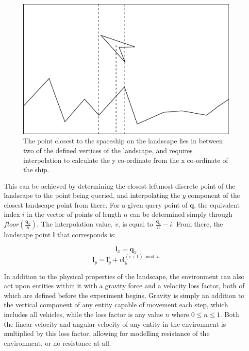\documentclass[conference]{IEEEtran}
\begin{document}
\begin{figure}[hbtp]
\centering
\includegraphics[scale=0.5]{img/landscapepoint}
\caption{The point closest to the spaceship on the landscape lies in between two of the defined vertices of the landscape, and requires interpolation to calculate the y co-ordinate from the x co-ordinate of the ship.}
\label{fig:graph_landscapepoint}
\end{figure}

This can be achieved by determining the closest leftmost discrete point of the landscape to the point being queried, and interpolating the $y$ component of the closest landscape point from there. For a given query point of $\boldsymbol {q}$, the equivalent index $i$ in the vector of points of length $n$ can be determined simply through $floor(\frac{\boldsymbol {q}_{x}}{n})$. The interpolation value, $v$, is equal to $\frac{\boldsymbol {q}_{x}}{n} - i$. From there, the landscape point $\boldsymbol {l}$ that corresponds is:

\begin{equation}
\boldsymbol {l}_{x} = \boldsymbol {q}_{x}
\end{equation}
\begin{equation}
\boldsymbol {l}_{y} = \boldsymbol {l}_{y}^{i} + v\boldsymbol {l}_{y}^{(i+1)\bmod{n}}
\end{equation}

In addition to the physical properties of the landscape, the environment can also act upon entities within it with a gravity force and a velocity loss factor, both of which are defined before the experiment begins. Gravity is simply an addition to the vertical component of any entity capable of movement each step, which includes all vehicles, while the loss factor is any value $n$ where $0 \le n \leq 1$. Both the linear velocity and angular velocity of any entity in the environment is multiplied by this loss factor, allowing for modelling resistance of the environment, or no resistance at all. 
\end{document}
